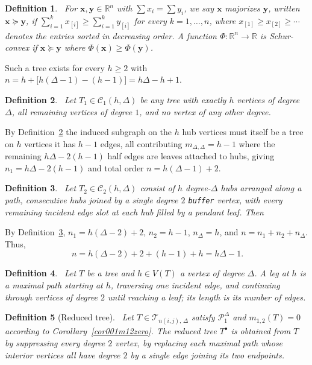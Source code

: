 \documentclass[12pt]{amsart}
\newtheorem{definition}{Definition}
\newcommand{\TT}{\mathcal{T}}
\begin{document}
\begin{definition}~\label{deffMajorization}
For $\mathbf x,\mathbf y\in\mathbb R^n$ with $\sum x_i=\sum y_i$, we say
$\mathbf x$ majorizes $\mathbf y$, written $\mathbf x\succeq \mathbf y$,
if $\sum_{i=1}^k x_{[i]} \ge \sum_{i=1}^k y_{[i]}$ for every $k=1,\dots,n$,
where $x_{[1]}\ge x_{[2]}\ge\cdots$ denotes the entries sorted in decreasing
order. A function $\Phi:\mathbb R^n\to\mathbb R$ is \emph{Schur-convex} if
$\mathbf x\succeq\mathbf y$ where $\Phi(\mathbf x)\ge \Phi(\mathbf y)$.
\end{definition}

Such a tree exists for every $h\geqslant 2$ with
$n=h+\big[h(\Delta-1)-(h-1)\big] = h\Delta - h + 1$. 
\begin{definition}~\label{deffhubver001}
Let $T_1\in\mathcal C_1(h,\Delta)$ be any tree with exactly $h$ vertices of
degree $\Delta$, all remaining vertices of degree $1$, and no vertex of any
other degree. 
\end{definition}
By Definition~\ref{deffhubver001} the induced subgraph on the $h$ hub vertices must itself be a tree on $h$ vertices   it has $h-1$ edges, all
contributing $m_{\Delta,\Delta}=h-1$ where the remaining
$h\Delta - 2(h-1) $ half edges are leaves attached to hubs, giving
$n_1 = h\Delta-2(h-1)$ and total order $n=h(\Delta-1)+2$.


\begin{definition}~\label{deffhubver002}
Let $T_2\in\mathcal C_2(h,\Delta)$ consist of $h$ degree-$\Delta$ hubs
arranged along a path, consecutive hubs joined by a single degree $2$
\texttt{buffer} vertex, with every remaining incident edge
slot at each hub filled by a pendant leaf. Then
\end{definition}

By Definition~\ref{deffhubver002},  $n_1=h(\Delta-2)+2$, $n_2=h-1$, $n_\Delta = h$, and $n= n_1+n_2+n_\Delta$. Thus, 
\begin{equation}~\label{eqq1deffhubver002}
n=h(\Delta-2)+2+(h-1)+h = h\Delta - 1.
\end{equation}

\begin{definition}~\label{deffleg001}
Let $T$ be a tree and $h\in V(T)$ a vertex of degree $\Delta$. A leg at $h$ is a maximal path starting at $h$, traversing one incident edge, and continuing through vertices of degree $2$ until reaching a leaf; its length is its number of edges.
\end{definition}

\begin{definition}[Reduced tree]~\label{def001reducedtree}
Let $T\in \TT_{n(i,j),\,\Delta}$ satisfy $\mathcal P_1^\Delta$ and $m_{1,2}(T)=0$ according to Corollary~\ref{cor001m12zero}.
The \emph{reduced tree} $T^\bullet$ is obtained from $T$ by suppressing every degree $2$ vertex, by replacing each maximal path whose interior vertices all have degree $2$ by a single edge joining its two endpoints.
\end{definition}
\end{document}
